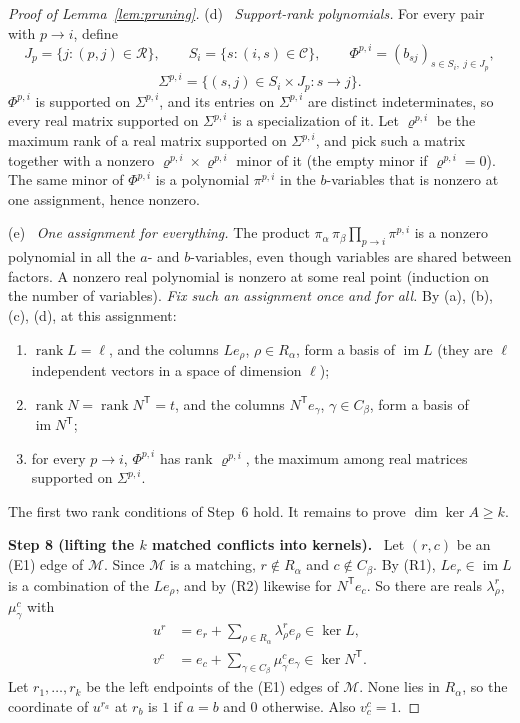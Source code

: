 \documentclass[11pt]{article}
\theoremstyle{remark}
\DeclareMathOperator{\rank}{rank}
\DeclareMathOperator{\im}{im}
\newcommand{\step}[1]{\par\medskip\noindent\textbf{Step #1.}\ }
\newcommand{\substep}[1]{\par\smallskip\noindent\textup{(#1)}\ }
\begin{document}
\begin{proof}[Proof of Lemma~\ref{lem:pruning}]
\substep{d} \emph{Support-rank polynomials.}
For every pair with $p\to i$, define
\[
 J_p=\{j:(p,j)\in\mathcal R\},\qquad
 S_i=\{s:(i,s)\in\mathcal C\},\qquad
 \Phi^{p,i}=(b_{sj})_{s\in S_i,\ j\in J_p},
\]
\[
 \Sigma^{p,i}=\{(s,j)\in S_i\times J_p:s\to j\}.
\]
$\Phi^{p,i}$ is supported on $\Sigma^{p,i}$, and its entries on
$\Sigma^{p,i}$ are distinct indeterminates, so every real matrix supported on
$\Sigma^{p,i}$ is a specialization of it. Let $\varrho^{p,i}$ be the maximum
rank of a real matrix supported on $\Sigma^{p,i}$, and pick such a matrix
together with a nonzero $\varrho^{p,i}\times\varrho^{p,i}$ minor of it (the
empty minor if $\varrho^{p,i}=0$). The same minor of $\Phi^{p,i}$ is a
polynomial $\pi^{p,i}$ in the $b$-variables that is nonzero at one
assignment, hence nonzero.

\substep{e} \emph{One assignment for everything.}
The product $\pi_\alpha\,\pi_\beta\prod_{p\to i}\pi^{p,i}$ is a nonzero
polynomial in all the $a$- and $b$-variables, even though variables are
shared between factors. A nonzero real polynomial is nonzero at some real
point (induction on the number of variables). \emph{Fix such an assignment
once and for all.} By (a), (b), (c), (d), at this assignment:
\begin{enumerate}[label=\textup{(R\arabic*)},leftmargin=3em,itemsep=1pt]
\item $\rank L=\ell$, and the columns $Le_\rho$, $\rho\in R_\alpha$, form a
basis of $\im L$ (they are $\ell$ independent vectors in a space of dimension
$\ell$);
\item $\rank N=\rank N^{\mathsf T}=t$, and the columns
$N^{\mathsf T}e_\gamma$, $\gamma\in C_\beta$, form a basis of
$\im N^{\mathsf T}$;
\item for every $p\to i$, $\Phi^{p,i}$ has rank $\varrho^{p,i}$, the maximum
among real matrices supported on $\Sigma^{p,i}$.
\end{enumerate}
The first two rank conditions of Step~6 hold. It remains to prove
$\dim\ker A\ge k$.

\step{8 (lifting the $k$ matched conflicts into kernels)}
Let $(r,c)$ be an (E1) edge of $\mathcal M$. Since $\mathcal M$ is a
matching, $r\notin R_\alpha$ and $c\notin C_\beta$. By (R1),
$Le_r\in\im L$ is a combination of the $Le_\rho$, and by (R2) likewise for
$N^{\mathsf T}e_c$. So there are reals $\lambda^r_\rho$, $\mu^c_\gamma$ with
\begin{equation}\label{eq:pruning-lifts}
 \begin{aligned}
 u^r&=e_r+\sum_{\rho\in R_\alpha}\lambda_\rho^r e_\rho
                 \in\ker L,\\
 v^c&=e_c+\sum_{\gamma\in C_\beta}\mu_\gamma^c e_\gamma
                 \in\ker N^{\mathsf T}.
 \end{aligned}
\end{equation}
Let $r_1,\dots,r_k$ be the left endpoints of the (E1) edges of $\mathcal M$.
None lies in $R_\alpha$, so the coordinate of $u^{r_a}$ at $r_b$ is $1$ if
$a=b$ and $0$ otherwise. Also $v^c_c=1$.


\end{proof}
\end{document}
